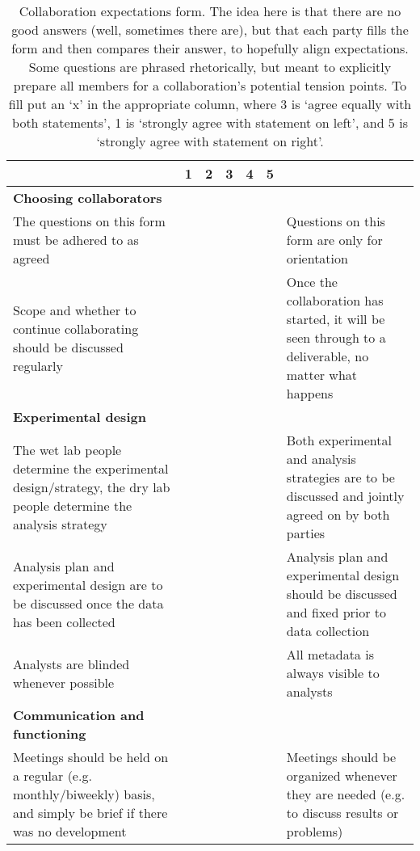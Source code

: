 \setlength\extrarowheight{4pt}

\begin{table}[!ht]
   \caption{Collaboration expectations form. The idea here is that there are no good answers (well, sometimes there are), but that each party fills the form and then compares their answer, to hopefully align expectations. Some questions are phrased rhetorically, but meant to explicitly prepare all members for a collaboration's potential tension points. {\color{red} To fill put an `x' in the appropriate column, where 3 is `agree equally with both statements', 1 is `strongly agree with statement on left', and 5 is `strongly agree with statement on right'}.
}
    \label{form}
    \raggedleft
    \begin{adjustbox}{max width=\textwidth}
    \begin{tabular}{|p{3in}|l|l|l|l|l|p{3in}|}
    \hline
        ~ & 1 & 2 & 3 & 4 & 5 & ~ \tabularnewline \hline
        \textbf{Choosing collaborators} & ~ & ~ & ~ & ~ & ~ & ~ \tabularnewline \hline
        The questions on this form must be adhered to as agreed & ~ & ~ & ~ & ~ & ~ & Questions on this form are only for orientation \\ \hline
        Scope and whether to continue collaborating should be discussed regularly & ~ & ~ & ~ & ~ & ~ & Once the collaboration has started, it will be seen through to a deliverable, no matter what happens \\ \hline
        \textbf{Experimental design} & ~ & ~ & ~ & ~ & ~ & ~ \\ \hline
        The wet lab people determine the experimental design/strategy, the dry lab people determine the analysis strategy & ~ & ~ & ~ & ~ & ~ & Both experimental and analysis strategies are to be discussed and jointly agreed on by both parties \\ \hline
        Analysis plan and experimental design are to be discussed once the data has been collected & ~ & ~ & ~ & ~ & ~ & Analysis plan and experimental design should be discussed and fixed prior to data collection \\ \hline
        Analysts are blinded whenever possible & ~ & ~ & ~ & ~ & ~ & All metadata is always visible to analysts \\ \hline
        \textbf{Communication and functioning} & ~ & ~ & ~ & ~ & ~ & ~ \\ \hline
        Meetings should be held on a regular (e.g. monthly/biweekly) basis, and simply be brief if there was no development & ~ & ~ & ~ & ~ & ~ & Meetings should be organized whenever they are needed (e.g. to discuss results or problems) \\ \hline

\end{tabular}
\end{adjustbox}
\end{table}
